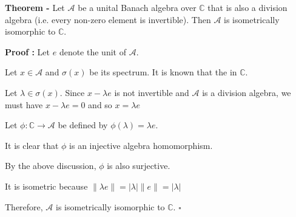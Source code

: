 \documentclass[12pt]{article}
\begin{document}
{\bf Theorem -} Let $\mathcal{A}$ be a unital Banach algebra over $\mathbb{C}$ that is also a division algebra (i.e. every non-zero element is invertible). Then $\mathcal{A}$ is isometrically isomorphic to $\mathbb{C}$.

{\bf Proof :} Let $e$ denote the unit of $\mathcal{A}$.

Let $x \in \mathcal{A}$ and $\sigma(x)$ be its spectrum. It is known that the  in $\mathbb{C}$.

Let $\lambda \in \sigma(x)$. Since $x-\lambda e$ is not invertible and $\mathcal{A}$ is a division algebra, we must have $x-\lambda e = 0$ and so $x=\lambda e$

Let $\phi : \mathbb{C} \longrightarrow \mathcal{A}$ be defined by $\phi(\lambda)=\lambda e$.

It is clear that $\phi$ is an injective algebra homomorphism.

By the above discussion, $\phi$ is also surjective.

It is isometric because $\|\lambda e\| = |\lambda| \|e\| = |\lambda|$

Therefore, $\mathcal{A}$ is isometrically isomorphic to $\mathbb{C}$. $\square$
\end{document}
